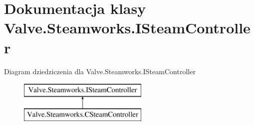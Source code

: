 \hypertarget{class_valve_1_1_steamworks_1_1_i_steam_controller}{}\section{Dokumentacja klasy Valve.\+Steamworks.\+I\+Steam\+Controller}
\label{class_valve_1_1_steamworks_1_1_i_steam_controller}
Diagram dziedziczenia dla Valve.\+Steamworks.\+I\+Steam\+Controller\begin{figure}[H]
\begin{center}
\leavevmode
\includegraphics[height=2.000000cm]{class_valve_1_1_steamworks_1_1_i_steam_controller}
\end{center}
\end{figure}
